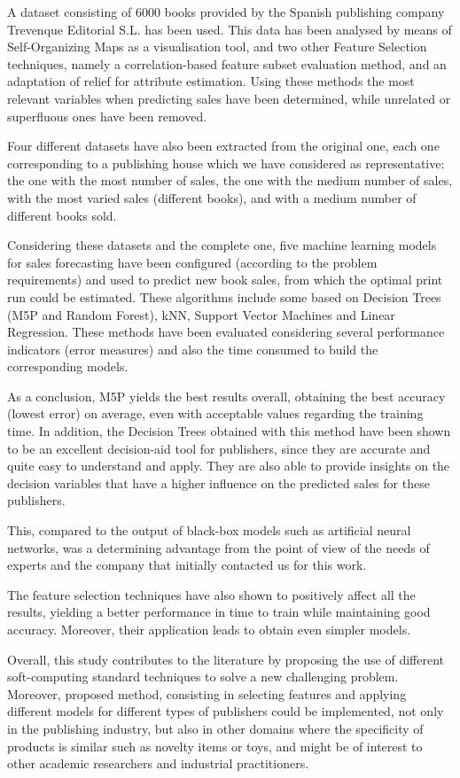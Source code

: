 \documentclass[a4paper,10pt,twocolumn,preprint,3p]{elsarticle}
\begin{document}
A dataset consisting of 6000 books provided by the Spanish publishing
company Trevenque Editorial S.L. has been used. This data has been
analysed by means of Self-Organizing Maps as a visualisation tool, and
two other Feature Selection techniques, namely a correlation-based
feature subset evaluation method, and an adaptation of relief for
attribute estimation. Using these methods the most relevant variables
when predicting sales have been determined, while unrelated or
superfluous ones have been removed. 

Four different datasets have also been extracted from the original
one, each one corresponding to a publishing house which we have
considered as representative: the one with the most number of sales,
the one with the medium number of sales, with the most varied sales
(different books), and with a medium number of different books sold. 

Considering these datasets and the complete one, five machine learning
models for sales forecasting have been configured (according to the
problem requirements) and used to predict new book sales, from which
the optimal print run could be estimated. These algorithms include
some based on Decision Trees (M5P and Random Forest), kNN, Support
Vector Machines and Linear Regression. 
These methods have been evaluated considering several performance
indicators (error measures) and also the time consumed to build the
corresponding models. 

As a conclusion, M5P yields the best results overall, obtaining the best accuracy 
(lowest error) on average, even with acceptable values regarding the training time.
In addition, the Decision Trees obtained with this method have been
shown to be an excellent decision-aid tool for publishers, since they are accurate 
and quite easy to understand and apply. 
They are also able to provide insights on the decision variables that
have a higher influence on the predicted sales for these publishers. 

This, compared to the output of black-box models such as artificial
neural networks, was a determining advantage from the point of view of
the needs of experts and the company that initially contacted us for
this work. 

The feature selection techniques have also shown to positively affect
all the results, yielding a better performance in time to train while
maintaining good accuracy. Moreover, their application leads to obtain
even simpler models. 

Overall, this study contributes to the literature by proposing the use
of different soft-computing standard techniques to solve a new
challenging problem. 
Moreover, proposed method, consisting in selecting features and
applying different models for different types of publishers could be
implemented, not only in the publishing  
industry, but also in other domains where the specificity of products
is similar such as novelty items or toys, and might be of interest to other 
academic researchers and industrial practitioners.
\end{document}
